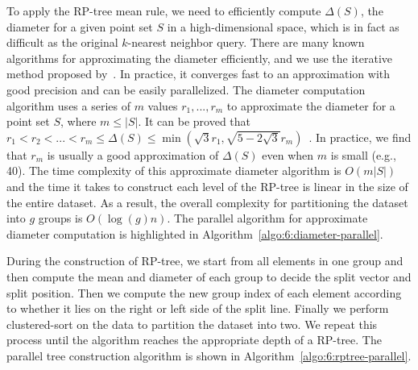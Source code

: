 To apply the RP-tree mean rule, we need to efficiently compute $\Delta(S)$, the diameter for a given point set $S$ in a high-dimensional space, which is in fact as difficult as the original $k$-nearest neighbor query. There are many known algorithms for approximating the diameter efficiently, and we use the iterative method proposed by~\cite{Egecioglu:1989:ADS}. In practice, it converges fast to an approximation with good precision and can be easily parallelized. The diameter computation algorithm uses a series of $m$ values $r_1, ..., r_m$ to approximate the diameter for a point set $S$, where $m \leq |S|$. It can be proved that $r_1 < r_2 < ... < r_m \leq \Delta(S) \leq \min(\sqrt{3}r_1, \sqrt{5-2\sqrt{3}}r_m)$~\cite{Egecioglu:1989:ADS}. In practice, we find that $r_m$ is usually a good approximation of $\Delta(S)$ even when $m$ is small (e.g., 40). The time complexity of this approximate diameter algorithm is $O(m|S|)$ and the time it takes to construct each level of the RP-tree is linear in the size of the entire dataset. As a result, the overall complexity for partitioning the dataset into $g$ groups is $O(\log(g) n)$. The parallel algorithm for approximate diameter computation is highlighted in Algorithm~\ref{algo:6:diameter-parallel}.

During the construction of RP-tree, we start from all elements in one group and then compute the mean and diameter of each group to decide the split vector and split position. Then we compute the new group index of each element according to whether it lies on the right or left side of the split line. Finally we perform clustered-sort on the data to partition the dataset into two. We repeat this process until the algorithm reaches the appropriate depth of a RP-tree. The parallel tree construction algorithm is shown in Algorithm~\ref{algo:6:rptree-parallel}.

